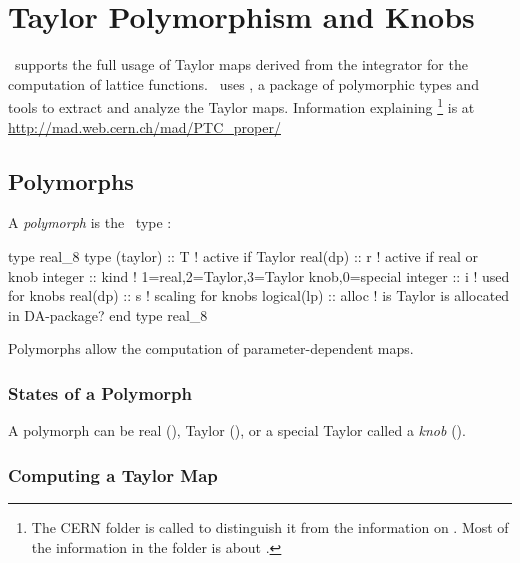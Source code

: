 
\chapter{Taylor Polymorphism and Knobs}
\label{cha:polymorphs.knobs}

%
\PTC\ supports the full usage of Taylor maps derived from the integrator for the computation of lattice functions. \PTC\ uses \FPP, a package of polymorphic types and tools to extract and analyze the Taylor maps.
Information explaining \FPP%
\footnote{The CERN folder is called  to distinguish it from the information on \MadX. Most of the information in the  folder is about \FPP.}
is at \url{http://mad.web.cern.ch/mad/PTC_proper/}


\section{Polymorphs}

%
A \emph{polymorph} is the \Fninety\ type :

\begin{ptccode}
type real_8
  type (taylor) :: T   ! active if Taylor
  real(dp) :: r        ! active if real or knob
  integer :: kind      ! 1=real,2=Taylor,3=Taylor knob,0=special
  integer :: i         ! used for knobs
  real(dp) :: s        ! scaling for knobs
  logical(lp) :: alloc ! is Taylor is allocated in DA-package?
end type real_8
\end{ptccode}

Polymorphs allow the computation of parameter-dependent maps.


\subsection{States of a Polymorph}

%
A polymorph  can be
real (),
Taylor (),
or a special Taylor called a \emph{knob} ().


\subsection{Computing a Taylor Map}

